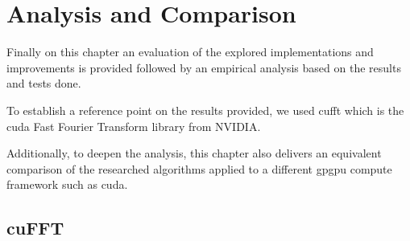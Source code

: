 \documentclass[
  oneside,
  11pt, a4paper,
  footinclude=true,
  headinclude=true,
  cleardoublepage=empty
]{scrbook}
\begin{document}










\chapter{Analysis and Comparison}

Finally on this chapter an evaluation of the explored implementations and improvements is provided followed by an empirical analysis based on the results and tests done. 

To establish a reference point on the results provided, we used \acrshort{cufft} which is the \acrshort{cuda} Fast Fourier Transform library from NVIDIA.

Additionally, to deepen the analysis, this chapter also delivers an equivalent comparison of the researched algorithms applied to a different \acrshort{gpgpu} compute framework such as \acrshort{cuda}. %



\section{cuFFT} \label{sec:cufft}
\end{document}
